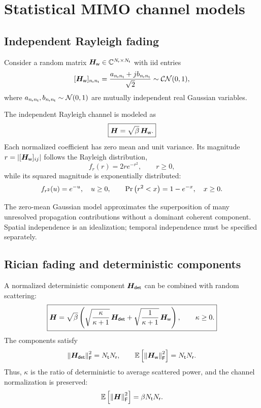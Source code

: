 \section{Statistical MIMO channel models}
\label{sec:models}

\subsection{Independent Rayleigh fading}

Consider a random matrix
$\bm{H}_{\mathsf w}\in\mathbb{C}^{N_{\mathsf{r}}\times N_{\mathsf{t}}}$
with \ac{iid} entries
\begin{equation}\label{eq:rayleigh}
	[\bm{H}_{\mathsf w}]_{n_{\mathsf{r}}n_{\mathsf{t}}}
	=\frac{a_{n_{\mathsf{r}}n_{\mathsf{t}}}+jb_{n_{\mathsf{r}}n_{\mathsf{t}}}}{\sqrt{2}}
	\sim\mathcal{CN}(0,1),
\end{equation}
where $a_{n_{\mathsf{r}}n_{\mathsf{t}}},b_{n_{\mathsf{r}}n_{\mathsf{t}}}\sim\mathcal{N}(0,1)$ are
mutually independent real Gaussian variables.

The independent Rayleigh channel is modeled as
\begin{equation*}
	\boxed{
		\bm{H}=\sqrt{\beta}\,\bm{H}_{\mathsf w}.
	}
\end{equation*}
Each normalized coefficient has zero mean and unit
variance. Its magnitude
$r=\left|[\bm{H}_{\mathsf w}]_{ij}\right|$
follows the Rayleigh distribution,
\begin{equation*}
	f_r(r)=2r e^{-r^2},\qquad r\geq0,
\end{equation*}
while its squared magnitude is exponentially
distributed:
\begin{equation}\label{eq:exponential}
	f_{r^2}(u)=e^{-u},\quad u\geq0,
	\qquad
	\Pr\left(r^2<x\right)=1-e^{-x},\quad x\geq0.
\end{equation}

The zero-mean Gaussian model approximates the
superposition of many unresolved propagation
contributions without a dominant coherent component.
Spatial independence is an idealization; temporal
independence must be specified separately.


\subsection{Rician fading and deterministic components}

A normalized deterministic component
$\bm{H}_{\mathsf{det}}$ can be combined with
random scattering:
\begin{equation}\label{eq:rician}
	\boxed{
		\bm{H}=\sqrt{\beta}\left(
		\sqrt{\frac{\kappa}{\kappa+1}}\,
		\bm{H}_{\mathsf{det}}
		+\sqrt{\frac{1}{\kappa+1}}\,
		\bm{H}_{\mathsf w}
		\right),\qquad \kappa\geq0.
	}
\end{equation}
The components satisfy
\begin{equation*}
	\left\|\bm{H}_{\mathsf{det}}\right\|_{\mathsf{F}}^2
	=N_{\mathsf{t}}N_{\mathsf{r}},
	\qquad
	\mathbb{E}\left[\left\|\bm{H}_{\mathsf w}\right\|_{\mathsf{F}}^2\right]
	=N_{\mathsf{t}}N_{\mathsf{r}}.
\end{equation*}
Thus, $\kappa$ is the ratio of deterministic to average
scattered power, and the channel normalization is
preserved:
\begin{equation*}
	\mathbb{E}\left[\left\|\bm{H}\right\|_{\mathsf{F}}^2\right]
	=\beta N_{\mathsf{t}}N_{\mathsf{r}}.
\end{equation*}

